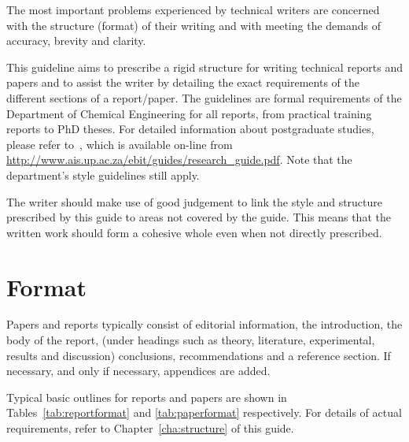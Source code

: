\documentclass[a5paper, 10pt]{article}
\begin{document}
The most important problems experienced by technical writers are
concerned with the structure (format) of their writing and with
meeting the demands of accuracy, brevity and clarity.

This guideline aims to prescribe a rigid structure for writing
technical reports and papers and to assist the writer by detailing the
exact requirements of the different sections of a report/paper.  The
guidelines are formal requirements of the Department of Chemical
Engineering for all reports, from practical training reports to PhD
theses.  For detailed information about postgraduate studies,
please refer to~\citet{buys}, which is available on-line from
\url{http://www.ais.up.ac.za/ebit/guides/research_guide.pdf}.  Note
that the department's style guidelines still apply.

The writer should make use of good judgement to link the style and
structure prescribed by this guide to areas not covered by the guide.
This means that the written work should form a cohesive whole even
when not directly prescribed.

\section{Format}
\label{cha:format}
Papers and reports typically consist of editorial information, the
introduction, the body of the report, (under headings such as theory,
literature, experimental, results and discussion) conclusions,
recommendations and a reference section.  If necessary, and only if
necessary, appendices are added.

Typical basic outlines for reports and papers are shown in
Tables~\ref{tab:reportformat} and \ref{tab:paperformat} respectively.
For details of actual requirements, refer to
Chapter~\ref{cha:structure} of this guide.  
\end{document}
